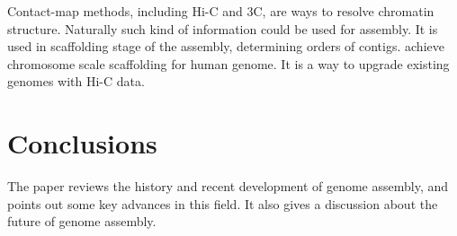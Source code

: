 \documentclass{bioinfo}
\begin{document}
Contact-map methods, including Hi-C and 3C, are ways to resolve chromatin structure. Naturally such kind of information could be used for assembly. It is used in scaffolding stage of the assembly, determining orders of contigs. \cite{burton2013chromosome} achieve chromosome scale scaffolding for human genome. It is a way to upgrade existing genomes with Hi-C data. 


\section{Conclusions}

The paper reviews the history and recent development of genome assembly, and points out some key advances in this field. It also gives a discussion about the future of genome assembly.

%
%
%
%
%
%
%
%
%


\end{document}
